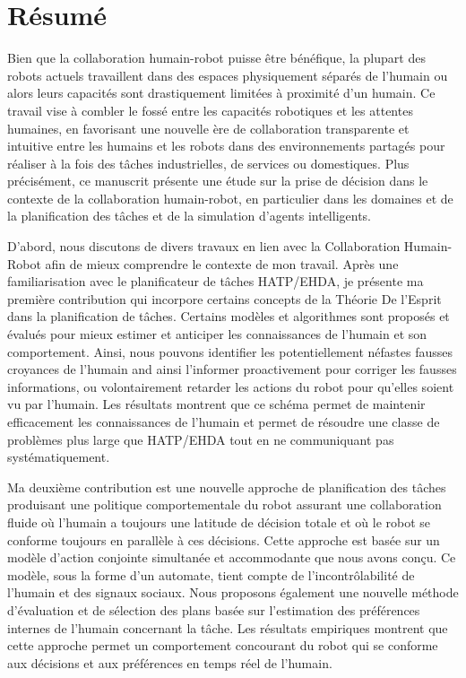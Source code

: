 \chapter*{Résumé}


Bien que la collaboration humain-robot puisse être bénéfique, la plupart des robots actuels travaillent dans des espaces physiquement séparés de l'humain ou alors leurs capacités sont drastiquement limitées à proximité d'un humain. Ce travail vise à combler le fossé entre les capacités robotiques et les attentes humaines, en favorisant une nouvelle ère de collaboration transparente et intuitive entre les humains et les robots dans des environnements partagés pour réaliser à la fois des tâches industrielles, de services ou domestiques. Plus précisément, ce manuscrit présente une étude sur la prise de décision dans le contexte de la collaboration humain-robot, en particulier dans les domaines et de la planification des tâches et de la simulation d'agents intelligents.

D'abord, nous discutons de divers travaux en lien avec la Collaboration Humain-Robot afin de mieux comprendre le contexte de mon travail. Après une familiarisation avec le planificateur de tâches HATP/EHDA, je présente ma première contribution qui incorpore certains concepts de la Théorie De l'Esprit dans la planification de tâches. Certains modèles et algorithmes sont proposés et évalués pour mieux estimer et anticiper les connaissances de l'humain et son comportement. Ainsi, nous pouvons identifier les potentiellement néfastes fausses croyances de l'humain and ainsi l'informer proactivement pour corriger les fausses informations, ou volontairement retarder les actions du robot pour qu'elles soient vu par l'humain. Les résultats montrent que ce schéma permet de maintenir efficacement les connaissances de l'humain et permet de résoudre une classe de problèmes plus large que HATP/EHDA tout en ne communiquant pas systématiquement.

Ma deuxième contribution est une nouvelle approche de planification des tâches produisant une politique comportementale du robot assurant une collaboration fluide où l'humain a toujours une latitude de décision totale et où le robot se conforme toujours en parallèle à ces décisions. Cette approche est basée sur un modèle d'action conjointe simultanée et accommodante que nous avons conçu. Ce modèle, sous la forme d'un automate, tient compte de l'incontrôlabilité de l'humain et des signaux sociaux. Nous proposons également une nouvelle méthode d'évaluation et de sélection des plans basée sur l'estimation des préférences internes de l'humain concernant la tâche. Les résultats empiriques montrent que cette approche permet un comportement concourant du robot qui se conforme aux décisions et aux préférences en temps réel de l'humain.

